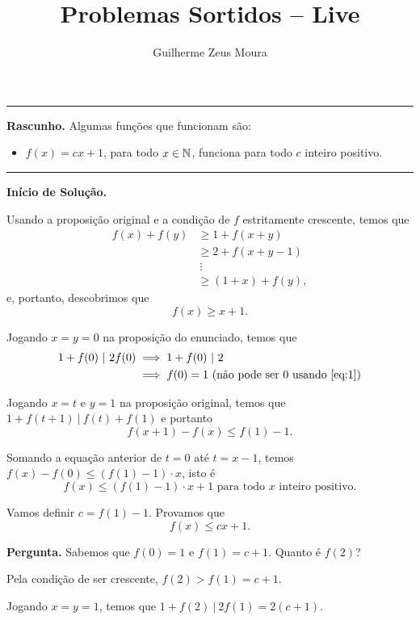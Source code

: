 \documentclass[10pt, a4paper]{article}
\title{Problemas Sortidos -- Live}
\author{Guilherme Zeus Moura}
\newcommand\seprule{
	
	\vspace{-1.5em}
	\begin{center}
		\rule{.97\textwidth}{.5pt}
	\end{center}
	\vspace{-.5em}

}
\begin{document}
	
	\zeustitle


	\seprule

	\noindent \textbf{Rascunho.} Algumas funções que funcionam são:	
	\begin{itemize}
		\item $f(x) = cx + 1$, para todo $x \in \mathbb{N}$, funciona para todo $c$ inteiro positivo.
	\end{itemize}

	\seprule

	\noindent \textbf{Início de Solução.}

	Usando a proposição original e a condição de $f$ estritamente crescente, temos que
	\begin{align*}
	f(x) + f(y) & \ge 1+f(x+y) \\
				& \ge 2 + f(x + y - 1) \\
				& \ \vdots \\
				& \ge (1 + x) + f(y),
	\end{align*}
	e, portanto, descobrimos que 
	\begin{equation}\label{eq:1} f(x) \ge x + 1. \end{equation}

	Jogando $x = y = 0$ na proposição do enunciado, temos que
	\begin{align*}
		1 + f(0)~|~2f(0) & \implies 1 + f(0)~|~2 \\
						 & \implies f(0) = 1 \text{ (não pode ser $0$ usando \ref{eq:1})}
	\end{align*}

	Jogando $x = t$ e $y = 1$ na proposição original, temos que $1 + f(t+1)~|~f(t) + f(1)$ e portanto \[f(x+1) - f(x) \le f(1) - 1.\]
	
	Somando a equação anterior de $t = 0$ até $t = x-1$, temos $f(x) - f(0) \le (f(1)-1) \cdot x$, isto é \[f(x) \le (f(1) - 1) \cdot x + 1\text{ para todo $x$ inteiro positivo.}\]

	Vamos definir $c = f(1) - 1$. Provamos que 
	\begin{equation}
		f(x) \le cx + 1.
	\end{equation}

	\noindent \textbf{Pergunta.} Sabemos que $f(0) = 1$ e $f(1) = c + 1$. Quanto é $f(2)$?

	Pela condição de ser crescente, $f(2) > f(1) = c + 1$.

	Jogando $x = y = 1$, temos que $1 + f(2)~|~2f(1) = 2(c+1)$.
\end{document}
